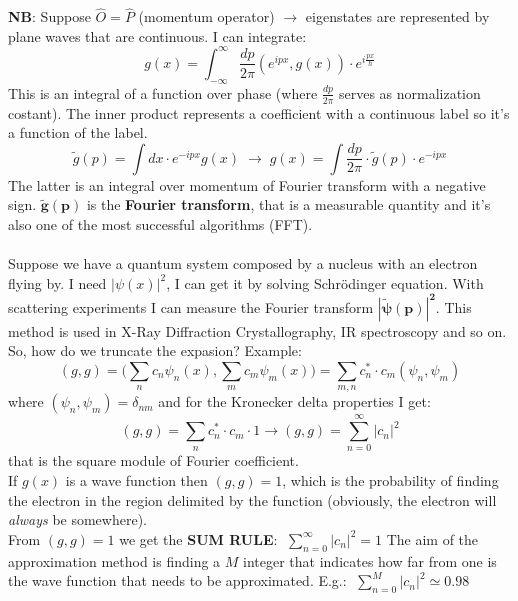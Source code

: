 \textbf{NB}: Suppose $\hat{O}=\hat{P}$ (momentum operator) $\rightarrow$ eigenstates are represented by plane waves that are continuous. I can integrate:\\
\[
g(x)=\int_{-\infty}^{\infty}\frac{dp}{2\pi}(e^{ipx},g(x))\cdot e^{i\frac{px}{\hbar}}
\]
This is an integral of a function over phase (where $\frac{dp}{2\pi}$ serves as normalization costant). The inner product represents a coefficient with a continuous label so it's a function of the label.
\[
\tilde{g}(p)=\int dx\cdot e^{-ipx}g(x)\; \rightarrow \; g(x)=\int \frac{dp}{2\pi} \cdot \tilde{g}(p) \cdot e^{-ipx}
\]
The latter is an integral over momentum of Fourier transform with a negative sign.
$\mathbf{\tilde{g}(p)}$ is the \textbf{Fourier transform}, that is a measurable quantity and it's also one of the most successful algorithms (FFT).\\
\\
Suppose we have a quantum system composed by a nucleus with an electron flying by. I need $|\psi(x)|^2$, I can get it by solving Schr{\"o}dinger equation. With scattering experiments I can measure the Fourier transform $\mathbf{|\tilde{\psi}(p)|^2}$. This method is used in X-Ray Diffraction Crystallography, IR spectroscopy and so on.
\newline
So, how do we truncate the expasion? Example:
\[
(g,g)=\biggl(\sum_nc_n\psi_n(x), \sum_mc_m\psi_m(x)\biggr) = \sum_{m,n}c_n^*\cdot c_m(\psi_n, \psi_m)
\]
where $(\psi_n,\psi_m)=\delta_{nm}$ and for the Kronecker delta properties I get:
\[
(g,g)= \sum_nc_n^* \cdot c_m \cdot 1 \rightarrow (g,g)=\sum_{n=0}^{\infty}|c_n|^2
\]
that is the square module of Fourier coefficient.\\
If $g(x)$ is a wave function then $(g,g)=1$, which is the probability of finding the electron in the region delimited by the function (obviously, the electron will \textit{always} be somewhere).\\
\newline
From $(g,g)=1$ we get the \textbf{SUM RULE}: $\; \sum_{n=0}^{\infty}|c_n|^2=1$
The aim of the approximation method is finding a $M$ integer that indicates how far from one is the wave function that needs to be approximated. E.g.: $\; \sum_{n=0}^{M}|c_n|^2 \simeq 0.98$\\

\noindent

